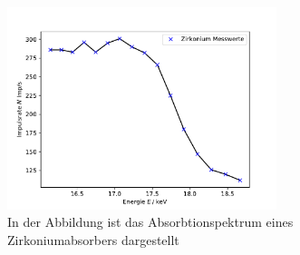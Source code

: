 \begin{figure}[H]
    \centering
    \includegraphics[width=0.7\textwidth]{plots/Zirkonium.pdf}
    \caption{In der Abbildung ist das Absorbtionspektrum eines Zirkoniumabsorbers dargestellt}
\end{figure}
\label{subsec:anhang1}
